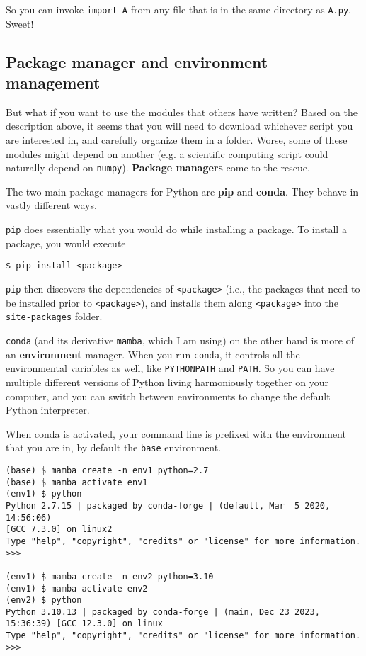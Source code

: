 \documentclass[12pt,letterpaper]{article}
\begin{document}
So you can invoke \texttt{import A} from any file that is in the same directory as \texttt{A.py}. Sweet!

\subsection{Package manager and environment management}

But what if you want to use the modules that others have written? Based on the description above, it seems that you will need to download whichever script you are interested in, and carefully organize them in a folder. Worse, some of these modules might depend on another (e.g. a scientific computing script could naturally depend on \verb|numpy|). \textbf{Package managers} come to the rescue.

The two main package managers for Python are \textbf{pip} and \textbf{conda}. They behave in vastly different ways.

\verb|pip| does essentially what you would do while installing a package. To install a package, you would execute

\verb|$ pip install <package>|

\verb|pip| then discovers the dependencies of \verb|<package>| (i.e., the packages that need to be installed prior to \verb|<package>|), and installs them along \verb|<package>| into the \verb|site-packages| folder.

\verb|conda| (and its derivative \verb|mamba|, which I am using) on the other hand is more of an \textbf{environment} manager. When you run \verb|conda|, it controls all the environmental variables as well, like \verb|PYTHONPATH| and \verb|PATH|. So you can have multiple different versions of Python living harmoniously together on your computer, and you can switch between environments to change the default Python interpreter.

When conda is activated, your command line is prefixed with the environment that you are in, by default the \verb|base| environment.

\begin{verbatim}
(base) $ mamba create -n env1 python=2.7
(base) $ mamba activate env1
(env1) $ python
Python 2.7.15 | packaged by conda-forge | (default, Mar  5 2020, 14:56:06)
[GCC 7.3.0] on linux2
Type "help", "copyright", "credits" or "license" for more information.
>>>

(env1) $ mamba create -n env2 python=3.10
(env1) $ mamba activate env2
(env2) $ python
Python 3.10.13 | packaged by conda-forge | (main, Dec 23 2023, 15:36:39) [GCC 12.3.0] on linux
Type "help", "copyright", "credits" or "license" for more information.
>>>
\end{verbatim}
\end{document}
